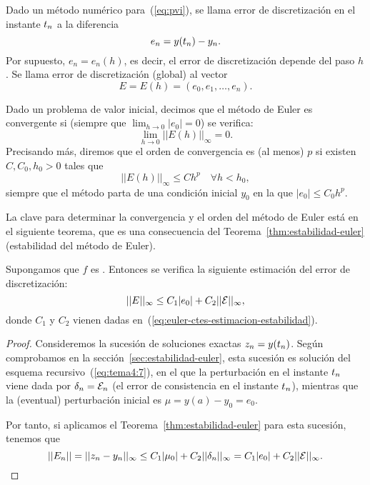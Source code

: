 \begin{definition}
  \label{def:error-discretizacion-pvi}
  Dado un método numérico para~(\ref{eq:pvi}), se llama error de
  discretización en el instante ${t_n}$ a la diferencia
  \begin{equation*}
    e_n = y({t_n})-{y_n}.
  \end{equation*}
  Por supuesto, $e_n=e_n(h)$, es decir, el error de discretización
  depende del paso $h$. Se llama error de discretización (global) al
  vector
  \begin{equation*}
    E = E(h) = (e_0,e_1,\dots,e_n).
  \end{equation*}
\end{definition}
\begin{definition}
  \label{def:convergencia-euler}
  Dado un problema de valor inicial, decimos que el método de Euler es
  convergente si (siempre que $\lim_{h\to 0} |e_0|=0$) se verifica:
  \begin{equation*}
    \lim_{h\to 0} ||E(h)||_\infty = 0.
  \end{equation*}
  Precisando más, diremos que el orden de convergencia es (al menos)
  $p$ si existen $C, C_0, h_0>0$ tales que
  \begin{equation*}
    ||E(h)||_\infty \le C h^p \quad \forall h<h_0,
  \end{equation*}
  siempre que el método parta de una condición inicial $y_0$ en la que
  $|e_0|\le C_0 h^p$.
\end{definition}

La clave para determinar la convergencia y el orden del método de
Euler está en el siguiente teorema, que es una consecuencia del
Teorema~\ref{thm:estabilidad-euler} (estabilidad del método de Euler).
\begin{theorem}
  \label{thm:euler:estimacion-error-discretizacion}
  Supongamos que $f$ es \globLipschitz. Entonces se verifica la
  siguiente estimación del error de discretización:
  \begin{equation}
    \label{eq:estimacion-discretizacion}
    ||E||_\infty \le C_1 |e_0| + C_2 ||{\cal E}||_\infty,
  \end{equation}
  donde $C_1$ y $C_2$ vienen dadas
  en~(\ref{eq:euler-ctes-estimacion-estabilidad}).
\end{theorem}
\begin{proof}
  Consideremos la sucesión de soluciones exactas $z_n=y({t_n})$. Según
  comprobamos en la sección~\ref{sec:estabilidad-euler}, esta sucesión
  es solución del esquema recursivo~(\ref{eq:tema4:7}), en el que la
  perturbación en el instante ${t_n}$ viene dada por
  $\delta_n={\cal E}_n$ (el error de consistencia en el instante
  ${t_n}$), mientras que la (eventual) perturbación inicial es
  $\mu=y(a)-y_0=e_0$.

  Por tanto, si aplicamos el Teorema~\ref{thm:estabilidad-euler} para
  esta sucesión, tenemos que
  $$
  ||E_n|| = ||{z_n} - {y_n}||_\infty \le C_1|\mu_0| + C_2
  ||\delta_n||_\infty  = C_1|e_0| + C_2 ||{\cal E}||_\infty.
  $$
\end{proof}

